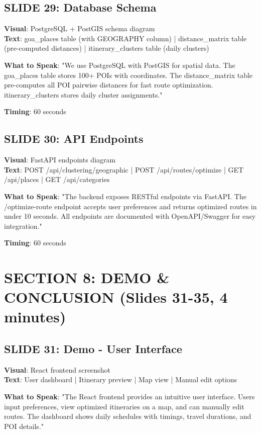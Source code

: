 \documentclass[12pt]{article}
\begin{document}
\subsection{SLIDE 29: Database Schema}
\textbf{Visual}: PostgreSQL + PostGIS schema diagram \\
\textbf{Text}: goa\_places table (with GEOGRAPHY column) | distance\_matrix table (pre-computed distances) | itinerary\_clusters table (daily clusters)

\textbf{What to Speak}:
"We use PostgreSQL with PostGIS for spatial data. The goa\_places table stores 100+ POIs with coordinates. The distance\_matrix table pre-computes all POI pairwise distances for fast route optimization. itinerary\_clusters stores daily cluster assignments."

\textbf{Timing}: 60 seconds

\subsection{SLIDE 30: API Endpoints}
\textbf{Visual}: FastAPI endpoints diagram \\
\textbf{Text}: POST /api/clustering/geographic | POST /api/routes/optimize | GET /api/places | GET /api/categories

\textbf{What to Speak}:
"The backend exposes RESTful endpoints via FastAPI. The /optimize-route endpoint accepts user preferences and returns optimized routes in under 10 seconds. All endpoints are documented with OpenAPI/Swagger for easy integration."

\textbf{Timing}: 60 seconds

\section{SECTION 8: DEMO \& CONCLUSION (Slides 31-35, 4 minutes)}

\subsection{SLIDE 31: Demo - User Interface}
\textbf{Visual}: React frontend screenshot \\
\textbf{Text}: User dashboard | Itinerary preview | Map view | Manual edit options

\textbf{What to Speak}:
"The React frontend provides an intuitive user interface. Users input preferences, view optimized itineraries on a map, and can manually edit routes. The dashboard shows daily schedules with timings, travel durations, and POI details."
\end{document}
